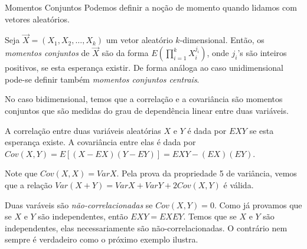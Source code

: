 \begin{frame}{Momentos Conjuntos}
%
Podemos definir a noção de momento quando lidamos com vetores aleatórios.

\begin{defi}
Seja $\vec{X}=(X_1,X_2,\ldots,X_k)$ um vetor aleatório $k$-dimensional. Então, os {\em momentos conjuntos} de $\vec{X}$ são da forma $E(\prod_{i=1}^{k}X_i^{j_i})$, onde $j_i$'s são inteiros positivos, se esta esperança existir. De forma análoga ao caso unidimensional pode-se definir também {\em momentos conjuntos centrais}.
\end{defi}
%
No caso bidimensional, temos que a correlação e a covariância são momentos conjuntos que
são medidas do grau de dependência linear entre duas variáveis.
%
\begin{defi}
A correlação entre duas variáveis aleatórias $X$ e $Y$ é dada por
$EXY$ se esta esperança existe. A covariância entre elas é dada por
$Cov(X,Y)=E[(X-EX)(Y-EY)]=EXY-(EX)(EY)$.
\end{defi}
%
Note que $Cov(X,X)=Var X$. Pela prova da propriedade 5 de variância,
vemos que a relação
$Var(X+Y)=Var X+Var Y+2Cov(X,Y)$ é válida.

Duas varáveis são {\em não-correlacionadas} se
$Cov(X,Y)=0$. Como já provamos que se $X$ e $Y$ são independentes, então
$EXY=EXEY$. Temos que se $X$ e $Y$ são independentes, elas
necessariamente são não-correlacionadas. O contrário nem sempre é
verdadeiro como o próximo exemplo ilustra.

\end{frame}
%
